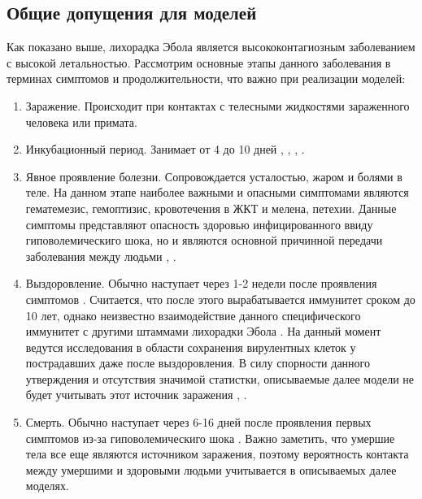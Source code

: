 \subsection{Общие допущения для моделей}
Как показано выше, лихорадка Эбола является высококонтагиозным заболеванием с высокой летальностью. Рассмотрим основные этапы данного заболевания в терминах симптомов и продолжительности, что важно при реализации моделей:
\begin{enumerate}
	\item Заражение. Происходит при контактах с телесными жидкостями зараженного человека или примата.
	\item Инкубационный период. Занимает от 4 до 10 дней \cite{WHO:2018:1}, \cite{CDC:Signs}, \cite{TheJournalOfMedicine:2014}, \cite{ncbi:2014}  . %
	\item Явное проявление болезни. Сопровождается усталостью, жаром и болями в теле. На данном этапе наиболее важными  и опасными симптомами являются гематемезис, гемоптизис, кровотечения в ЖКТ и мелена, петехии. Данные симптомы представляют опасность здоровью инфицированного ввиду гиповолемическиго шока, но и являются основной причинной передачи заболевания между людьми \cite{NYTM:2014}, \cite{CDC:Transmission}. %
	\item Выздоровление. Обычно наступает через 1-2 недели после проявления симптомов 
	\cite[с. 332]{Hunter:2013}. %
	Считается, что после этого вырабатывается иммунитет сроком до 10 лет, однако неизвестно взаимодействие данного специфического иммунитет с другими штаммами лихорадки Эбола \cite{CDC:Transmission}. %
	На данный момент ведутся исследования в области сохранения вирулентных клеток у пострадавших даже после выздоровления. В силу спорности данного утверждения и отсутствия значимой статистки, описываемые далее модели не будет учитывать этот источник заражения \cite{WHO:semen:2016}, \cite{ScienceTime:2015}. %
	\item Смерть. Обычно наступает через 6-16 дней после проявления первых симптомов из-за гиповолемическиго шока \cite{MicroBio:2014}. %
	Важно заметить, что умершие тела все еще являются источником заражения, поэтому вероятность контакта между умершими и здоровыми людьми учитывается в описываемых далее моделях.
\end{enumerate}
